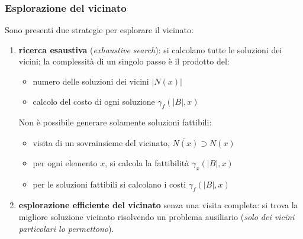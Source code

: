 \documentclass{article}
\begin{document}
\subsubsection{Esplorazione del vicinato}
Sono presenti due strategie per esplorare il vicinato:
\begin{enumerate}
    \item \textbf{ricerca esaustiva} (\textit{exhaustive search}): si calcolano tutte le soluzioni
    dei vicini; la complessità di un singolo passo è il prodotto del:
    \begin{itemize}
        \item numero delle soluzioni dei vicini $|N(x)|$
        \item calcolo del costo di ogni soluzione $\gamma_f(|B|,x)$
    \end{itemize}
    Non è possibile generare solamente soluzioni fattibili:
    \begin{itemize}
        \item visita di un sovrainsieme del vicinato, $\tilde{N(x)}\supset N(x)$
        \item per ogni elemento $x$, si calcola la fattibilità $\gamma_x(|B|,x)$
        \item per le soluzioni fattibili si calcolano i costi $\gamma_f(|B|,x)$
    \end{itemize}

    \item \textbf{esplorazione efficiente del vicinato} senza una visita completa: si trova la
    migliore soluzione vicinato risolvendo un problema ausiliario (\textit{solo dei vicini particolari lo permettono}).
\end{enumerate}
\end{document}
